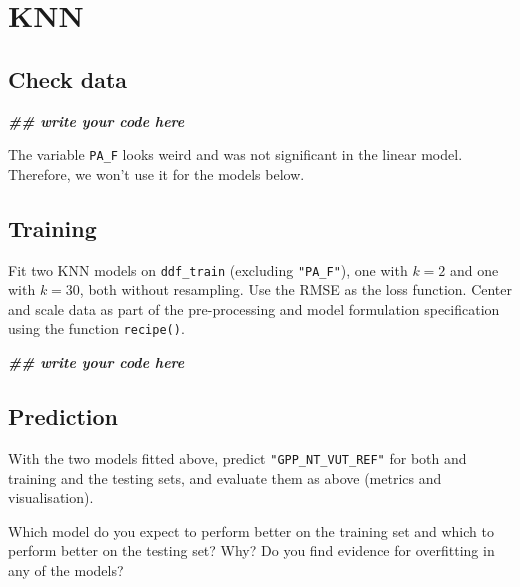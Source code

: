 \documentclass[
]{book}
\newenvironment{Shaded}{\begin{snugshade}}{\end{snugshade}}
\newcommand{\DocumentationTok}[1]{\textcolor[rgb]{0.56,0.35,0.01}{\textbf{\textit{#1}}}}
\begin{document}
\hypertarget{knn}{%
\section{KNN}\label{knn}}

\hypertarget{check-data}{%
\subsection{Check data}\label{check-data}}

\begin{Shaded}
\begin{Highlighting}[]
\DocumentationTok{\#\# write your code here}
\end{Highlighting}
\end{Shaded}

The variable \texttt{PA\_F} looks weird and was not significant in the linear model. Therefore, we won't use it for the models below.

\hypertarget{training-2}{%
\subsection{Training}\label{training-2}}

Fit two KNN models on \texttt{ddf\_train} (excluding \texttt{"PA\_F"}), one with \(k = 2\) and one with \(k = 30\), both without resampling. Use the RMSE as the loss function. Center and scale data as part of the pre-processing and model formulation specification using the function \texttt{recipe()}.

\begin{Shaded}
\begin{Highlighting}[]
\DocumentationTok{\#\# write your code here}
\end{Highlighting}
\end{Shaded}

\hypertarget{prediction-1}{%
\subsection{Prediction}\label{prediction-1}}

With the two models fitted above, predict \texttt{"GPP\_NT\_VUT\_REF"} for both and training and the testing sets, and evaluate them as above (metrics and visualisation).

Which model do you expect to perform better on the training set and which to perform better on the testing set? Why? Do you find evidence for overfitting in any of the models?
\end{document}
